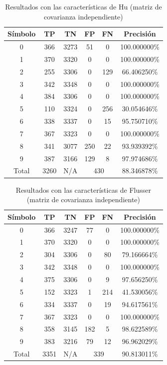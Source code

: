 \documentclass[a4paper, 11pt, oneside]{report}
\begin{document}
\begin{table}
\centering
\begin{tabular}{|c|c|c|c|c|c|}
	\hline
	Símbolo & TP & TN & FP & FN & Precisión \\ 
	\hline
	0 & 366 & 3273 & 51 & 0 & 100.000000\% \\ 
	1 & 370 & 3320 & 0 & 0 & 100.000000\% \\ 
	2 & 255 & 3306 & 0 & 129 & 66.406250\% \\ 
	3 & 342 & 3348 & 0 & 0 & 100.000000\% \\ 
	4 & 384 & 3306 & 0 & 0 & 100.000000\% \\ 
	5 & 110 & 3324 & 0 & 256 & 30.054646\% \\ 
	6 & 338 & 3337 & 0 & 15 & 95.750710\% \\ 
	7 & 367 & 3323 & 0 & 0 & 100.000000\% \\ 
	8 & 341 & 3077 & 250 & 22 & 93.939392\% \\ 
	9 & 387 & 3166 & 129 & 8 & 97.974686\% \\ 
	\hline
	Total & 3260 & N/A & \multicolumn{2}{|c|}{430} & 88.346878\% \\
	\hline
\end{tabular}
\caption{Resultados con las características de Hu (matriz de covarianza independiente)}
\label{tb:numHuIndep}
\end{table}

\begin{table}
\centering
\begin{tabular}{|c|c|c|c|c|c|}
	\hline
	Símbolo & TP & TN & FP & FN & Precisión \\ 
	\hline
	0 & 366 & 3247 & 77 & 0 & 100.000000\% \\ 
	1 & 370 & 3320 & 0 & 0 & 100.000000\% \\ 
	2 & 304 & 3306 & 0 & 80 & 79.166664\% \\ 
	3 & 342 & 3348 & 0 & 0 & 100.000000\% \\ 
	4 & 375 & 3306 & 0 & 9 & 97.656250\% \\ 
	5 & 152 & 3323 & 1 & 214 & 41.530056\% \\ 
	6 & 334 & 3337 & 0 & 19 & 94.617561\% \\ 
	7 & 367 & 3323 & 0 & 0 & 100.000000\% \\ 
	8 & 358 & 3145 & 182 & 5 & 98.622589\% \\ 
	9 & 383 & 3216 & 79 & 12 & 96.962029\% \\ 
	\hline
	Total & 3351 & N/A & \multicolumn{2}{|c|}{339} & 90.813011\% \\
	\hline
\end{tabular}
\caption{Resultados con las características de Flusser (matriz de covarianza independiente)}
\label{tb:numFlIndep}
\end{table}
\end{document}
